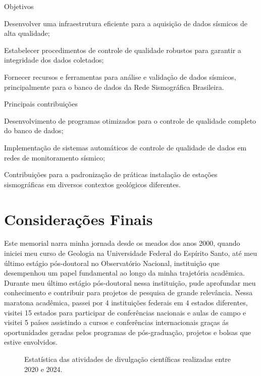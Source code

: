 \documentclass[10pt,a4paper,oneside]{book}
\begin{document}
\begin{fancyenum}{\faFutbol}{Objetivos}
  \item Desenvolver uma infraestrutura eficiente para a aquisição de dados sísmicos de alta qualidade;
  \item Estabelecer procedimentos de controle de qualidade robustos para garantir a integridade dos dados coletados;
  \item Fornecer recursos e ferramentas para análise e validação de dados sísmicos, principalmente para o banco de dados da Rede Sismográfica Brasileira.
\end{fancyenum}

\begin{fancyenum}{\faCogs}{Principais contribuições}
  \item Desenvolvimento de programas otimizados para o controle de qualidade completo do banco de dados;
  \item Implementação de sistemas automáticos de controle de qualidade de dados em redes de monitoramento sísmico;
  \item Contribuições para a padronização de práticas instalação de estações sismográficas em diversos contextos geológicos diferentes.
\end{fancyenum}


\chapter{Considerações Finais}
\label{cap_conclusao}

Este memorial narra minha jornada desde os meados dos anos 2000, quando iniciei meu curso de Geologia na Universidade Federal do Espírito Santo, até meu último estágio pós-doutoral no Observatório Nacional, instituição que desempenhou um papel fundamental ao longo da minha trajetória acadêmica. Durante meu último estágio pós-doutoral nessa instituição, pude aprofundar meu conhecimento e contribuir para projetos de pesquisa de grande relevância. Nessa maratona acadêmica, passei por 4 instituições federais em 4 estados diferentes, visitei 15 estados para participar de conferências nacionais e aulas de campo e visitei 5 países assistindo a cursos e conferências internacionais graças ás oportunidades geradas pelos programas de pós-graduação, projetos e bolsas que estive envolvidos.

\begin{figure}
	\centering
	\caption{Estatística das atividades de divulgação científicas realizadas entre 2020 e 2024.}
	\label{fig_resumo_divulgacao}
\end{figure}
\end{document}
